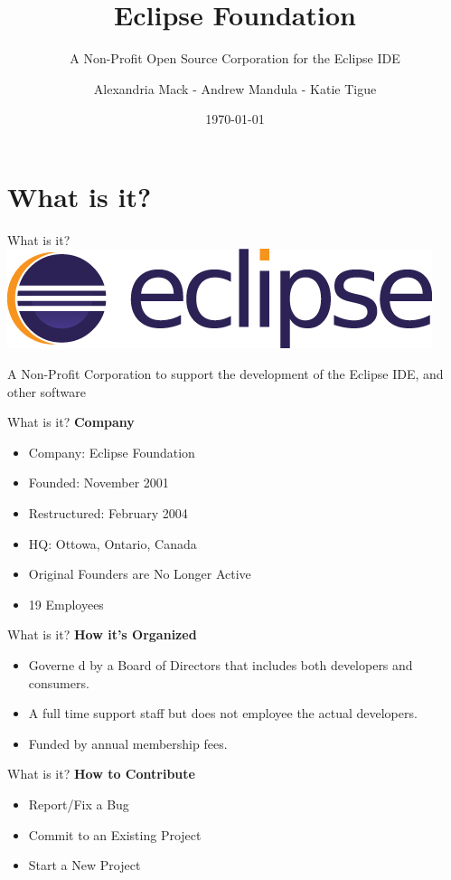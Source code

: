 \documentclass[10pt, compress]{beamer}
\title{Eclipse Foundation}
\subtitle{A Non-Profit Open Source Corporation for the Eclipse IDE}
\date{\today}
\author{Alexandria Mack - Andrew Mandula - Katie Tigue}
\institute{}
\begin{document}
\maketitle

\section{What is it?}

\begin{frame}{What is it?}
\includegraphics[width=\textwidth]{images/EclipseLogo.jpg}
\begin{center}A Non-Profit Corporation to support the development of the Eclipse IDE, and other software \end{center}
\end{frame}
    
    \begin{frame}{What is it?}
    \textbf{Company}
    \begin{itemize}
    \item Company: Eclipse Foundation
    \item Founded: November 2001
    \item Restructured: February 2004
    \item HQ: Ottowa, Ontario, Canada
    \item Original Founders are No Longer Active
    \item 19 Employees
    \end{itemize}
    \end{frame}
    
\begin{frame}{What is it?}
\textbf{How it's Organized}
\begin{itemize}
\item Governe  d by a Board of Directors that includes both developers and consumers.
\item A full time support staff but does not employee the actual developers.
\item Funded by annual membership fees.
\end{itemize}
\end{frame}

\begin{frame}{What is it?}
\textbf{How to Contribute}
\begin{itemize}
\item Report/Fix a Bug
\item Commit to an Existing Project
\item Start a New Project
\end{itemize}
\end{frame}
\end{document}
